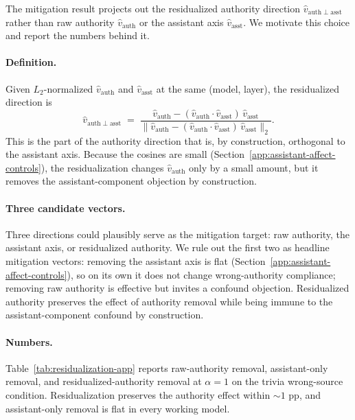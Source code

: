 \documentclass{article}
\begin{document}
The mitigation result projects out the residualized authority direction $\hat{v}_{\mathrm{auth}\perp\mathrm{asst}}$ rather than raw authority $\hat{v}_{\mathrm{auth}}$ or the assistant axis $\hat{v}_{\mathrm{asst}}$. We motivate this choice and report the numbers behind it.

\paragraph{Definition.}
Given $L_2$-normalized $\hat{v}_{\mathrm{auth}}$ and $\hat{v}_{\mathrm{asst}}$ at the same (model, layer), the residualized direction is
\begin{equation}
\hat{v}_{\mathrm{auth}\perp\mathrm{asst}}
\;=\;
\frac{\hat{v}_{\mathrm{auth}} - (\hat{v}_{\mathrm{auth}} \cdot \hat{v}_{\mathrm{asst}})\,\hat{v}_{\mathrm{asst}}}
     {\lVert\hat{v}_{\mathrm{auth}} - (\hat{v}_{\mathrm{auth}} \cdot \hat{v}_{\mathrm{asst}})\,\hat{v}_{\mathrm{asst}}\rVert_2}.
\end{equation}
This is the part of the authority direction that is, by construction, orthogonal to the assistant axis. Because the cosines are small (Section~\ref{app:assistant-affect-controls}), the residualization changes $\hat{v}_{\mathrm{auth}}$ only by a small amount, but it removes the assistant-component objection by construction.

\paragraph{Three candidate vectors.}
Three directions could plausibly serve as the mitigation target: raw authority, the assistant axis, or residualized authority. We rule out the first two as headline mitigation vectors: removing the assistant axis is flat (Section~\ref{app:assistant-affect-controls}), so on its own it does not change wrong-authority compliance; removing raw authority is effective but invites a confound objection. Residualized authority preserves the effect of authority removal while being immune to the assistant-component confound by construction.

\paragraph{Numbers.}
Table~\ref{tab:residualization-app} reports raw-authority removal, assistant-only removal, and residualized-authority removal at $\alpha=1$ on the trivia wrong-source condition. Residualization preserves the authority effect within $\sim 1$ pp, and assistant-only removal is flat in every working model.
\end{document}
